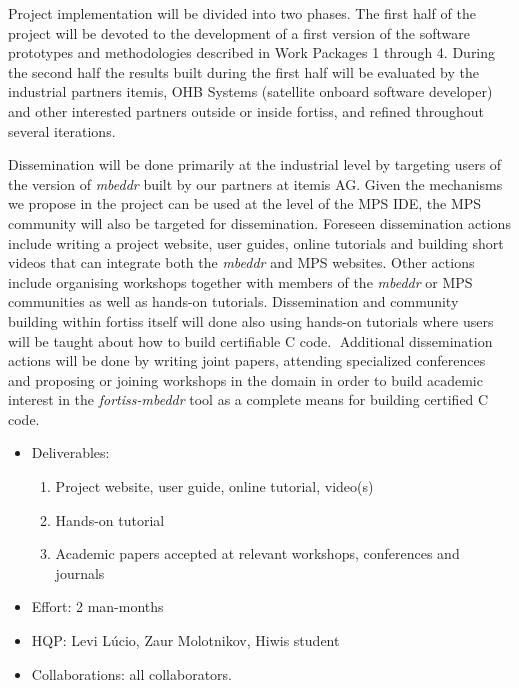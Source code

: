 Project implementation will be divided into two phases. The first
half of the project will be devoted to the development of a first version of
the software prototypes and methodologies described in Work Packages 1 through 4. During the second
half the results built during the first half will be evaluated by
the industrial partners itemis, OHB Systems (satellite onboard software
developer) and other interested partners outside or inside fortiss, and refined
throughout several iterations.

Dissemination will be done primarily at the industrial level by targeting users
of the version of \emph{mbeddr} built by our partners at itemis AG. Given the
mechanisms we propose in the project can be used at the level of the MPS IDE,
the MPS community will also be targeted for dissemination. Foreseen
dissemination actions include writing a project website, user guides, online
tutorials and building short videos that can integrate both the \emph{mbeddr} and MPS
websites. Other actions include organising workshops together with members of
the \emph{mbeddr} or MPS communities as well as hands-on tutorials.
Dissemination and community building within fortiss itself will done also using
hands-on tutorials where users will be taught about how to build certifiable C
code.􏰁 Additional dissemination actions will be done by writing joint papers,
attending specialized conferences and proposing or joining workshops in the
domain in order to build academic interest in the \emph{fortiss-mbeddr} tool as
a complete means for building certified C code.

\begin{itemize}
  \item Deliverables:
  \begin{enumerate}
    \item Project website, user guide, online tutorial, video(s)
	\item Hands-on tutorial
	\item Academic papers accepted at relevant workshops, conferences and journals
  \end{enumerate}
  \item Effort: 2 man-months
  \item HQP: Levi L\'ucio, Zaur Molotnikov, Hiwis student
  \item Collaborations: all collaborators.
\end{itemize}